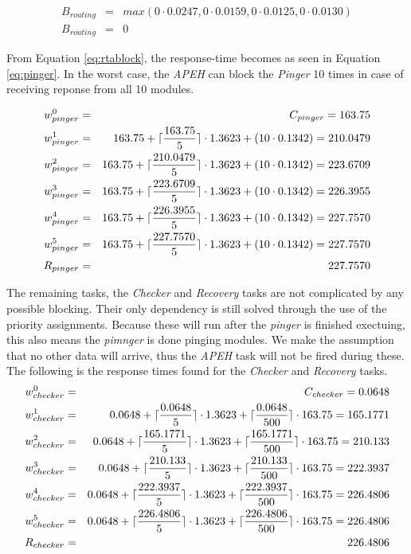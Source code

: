 \begin{eqnarray}
\label{eq:pingerblock}
     B_{routing} &=& max(0 \cdot 0.0247, 0 \cdot 0.0159, 0 \cdot 0.0125, 0 \cdot 0.0130) \nonumber \\
     B_{routing} &=& 0
\end{eqnarray}

From Equation \ref{eq:rtablock}, the response-time becomes as seen in Equation \ref{eq:pinger}. In the worst case, the \textit{APEH} can block the \textit{Pinger} 10 times in case of receiving reponse from all 10 modules.

\begin{eqnarray}
\label{eq:pinger}
    w_{pinger}^0 &=& C_{pinger} = 163.75 \nonumber \\ 
    w_{pinger}^1 &=& 163.75 + \lceil\frac{163.75}{5}\rceil \cdot 1.3623 + (10 \cdot 0.1342) = 210.0479 \nonumber \\ 
    w_{pinger}^2 &=& 163.75 + \lceil\frac{210.0479}{5}\rceil \cdot 1.3623 + (10 \cdot 0.1342) = 223.6709 \nonumber \\
    w_{pinger}^3 &=& 163.75 + \lceil\frac{223.6709}{5}\rceil \cdot 1.3623 + (10 \cdot 0.1342) = 226.3955 \nonumber \\
    w_{pinger}^4 &=& 163.75 + \lceil\frac{226.3955}{5}\rceil \cdot 1.3623 + (10 \cdot 0.1342) = 227.7570 \nonumber \\
    w_{pinger}^5 &=& 163.75 + \lceil\frac{227.7570}{5}\rceil \cdot 1.3623 + (10 \cdot 0.1342) = 227.7570 \nonumber \\
    R_{pinger} &=& 227.7570
\end{eqnarray}

The remaining tasks, the \textit{Checker} and \textit{Recovery} tasks are not complicated by any possible blocking. Their only dependency is still solved through the use of the priority assignments. Because these will run after the \textit{pinger} is finished exectuing, this also means the \textit{pimnger} is done pinging modules. We make the assumption that no other data will arrive, thus the \textit{APEH} task will not be fired during these. The following is the response times found for the \textit{Checker} and \textit{Recovery} tasks.
\begin{eqnarray}
\label{eq:checker}
    w_{checker}^0 &=& C_{checker} = 0.0648 \nonumber \\ 
    w_{checker}^1 &=& 0.0648 + \lceil\frac{0.0648}{5}\rceil \cdot 1.3623 + \lceil\frac{0.0648}{500}\rceil \cdot 163.75 = 165.1771 \nonumber \\ 
    w_{checker}^2 &=& 0.0648 + \lceil\frac{165.1771}{5}\rceil \cdot 1.3623 + \lceil\frac{165.1771}{500}\rceil \cdot 163.75 = 210.133 \nonumber \\
    w_{checker}^3 &=& 0.0648 + \lceil\frac{210.133}{5}\rceil \cdot 1.3623 + \lceil\frac{210.133}{500}\rceil \cdot 163.75 = 222.3937 \nonumber \\
    w_{checker}^4 &=& 0.0648 + \lceil\frac{222.3937}{5}\rceil \cdot 1.3623 + \lceil\frac{222.3937}{500}\rceil \cdot 163.75 = 226.4806 \nonumber \\
    w_{checker}^5 &=& 0.0648 + \lceil\frac{226.4806}{5}\rceil \cdot 1.3623 + \lceil\frac{226.4806}{500}\rceil \cdot 163.75 = 226.4806 \nonumber \\
    R_{checker} &=& 226.4806
\end{eqnarray}

